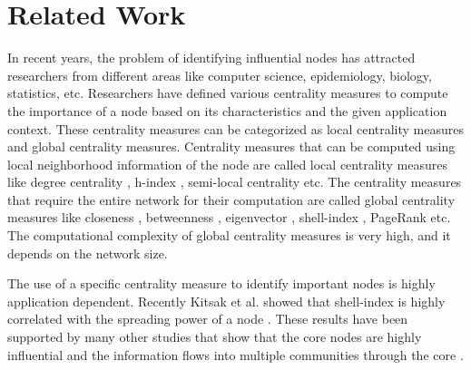 \documentclass[12pt,3p]{article}
\begin{document}
\section{Related Work}\label{relwork}


In recent years, the problem of identifying influential nodes has attracted researchers from different areas like computer science, epidemiology, biology, statistics, etc. Researchers have defined various centrality measures to compute the importance of a node based on its characteristics and the given application context. These centrality measures can be categorized as local centrality measures and global centrality measures. Centrality measures that can be computed using local neighborhood information of the node are called local centrality measures like degree centrality \cite{shaw1954some}, h-index \cite{hirsch2005index}, semi-local centrality \cite{chen2012identifying} etc. The centrality measures that require the entire network for their computation are called global centrality measures like closeness \cite{sabidussi1966centrality}, betweenness \cite{freeman1977set}, eigenvector \cite{stephenson1989rethinking}, shell-index \cite{seidman1983network}, PageRank \cite{brin1998anatomy} etc. The computational complexity of global centrality measures is very high, and it depends on the network size.

The use of a specific centrality measure to identify important nodes is highly application dependent. Recently Kitsak et al. showed that shell-index is highly correlated with the spreading power of a node \cite{kitsak2010identification}. These results have been supported by many other studies that show that the core nodes are highly influential and the information flows into multiple communities through the core \cite{saxena2015understanding, gupta2016modeling}.


\end{document}
